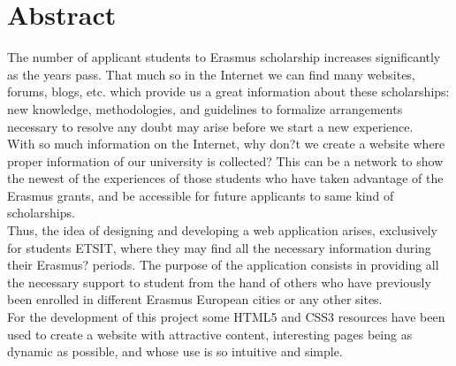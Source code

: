 \chapter{Abstract}
The number of applicant students to Erasmus scholarship increases significantly as the years pass. That much so in the Internet we can find many websites, forums, blogs, etc. which provide us a great information about these scholarships: new knowledge, methodologies, and guidelines to formalize arrangements necessary to resolve any doubt may arise before we start a new experience.\\

With so much information on the Internet, why don?t we create a website where proper information of our university is collected? This can be a network to show the newest of the experiences of those students who have taken advantage of the Erasmus grants, and be accessible for future applicants to same kind of scholarships.\\

Thus, the idea of designing and developing a web application arises, exclusively for students ETSIT, where they may find all the necessary information during their Erasmus? periods. The purpose of the application consists in providing all the necessary support to student from the hand of others who have previously been enrolled in different Erasmus European cities or any other sites.\\

For the development of this project some HTML5 and CSS3 resources have been used to create a website with attractive content, interesting pages being as dynamic as possible, and whose use is so intuitive and simple.\\
